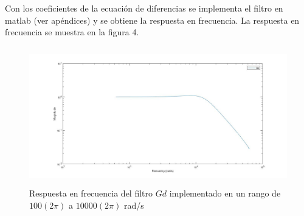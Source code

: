 \documentclass[12pt]{article}
\begin{document}
Con los coeficientes de la ecuación de diferencias se implementa el filtro en matlab (ver apéndices) y se obtiene la respuesta en frecuencia. La respuesta en frecuencia se muestra en la figura 4.

\begin{figure}[h]
        \centering
        \includegraphics[width=14cm, height=6cm]{im3.jpg}
        \caption{Respuesta en frecuencia del filtro $Gd$ implementado en un rango de $100(2\pi)$ a $10000(2\pi)$ rad/s}
\end{figure}
\newpage
\end{document}
